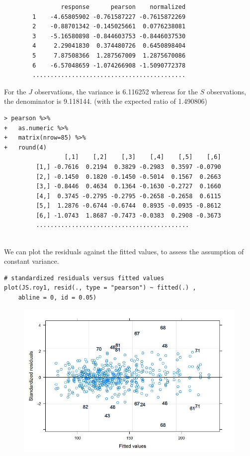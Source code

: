\documentclass[Main.tex]{subfiles}
\begin{document}
\begin{verbatim}
                response      pearson    normalized
        1    -4.65805902 -0.761587227 -0.7615872269
        2    -0.88701342 -0.145025661  0.0776238081
        3    -5.16580898 -0.844603753 -0.8446037530
        4     2.29041830  0.374480726  0.6450898404
        5     7.87508366  1.287567009  1.2875670086
        6    -6.57048659 -1.074266908 -1.5090772378
        ...........................................
\end{verbatim}
For the $J$ observations, the variance is 6.116252 whereas for the $S$ observations, the denominator is 9.118144. (with the expected ratio of  1.490806)


\begin{framed}
\begin{verbatim}
> pearson %>%
+   as.numeric %>% 
+   matrix(nrow=85) %>%
+   round(4) 
                 [,1]    [,2]    [,3]    [,4]    [,5]    [,6]
         [1,] -0.7616  0.2194  0.3829 -0.2983  0.3597 -0.0790
         [2,] -0.1450  0.1820 -0.1450 -0.5014  0.1567  0.2663
         [3,] -0.8446  0.4634  0.1364 -0.1630 -0.2727  0.1660
         [4,]  0.3745 -0.2795 -0.2795 -0.2658 -0.2658  0.6115
         [5,]  1.2876 -0.6744 -0.6744  0.8935 -0.0935 -0.8612
         [6,] -1.0743  1.8687 -0.7473 -0.0383  0.2908 -0.3673
         ...........................................
         
\end{verbatim}
\end{framed}

We can plot the residuals against the fitted values, to assess the assumption of constant variance. 
\begin{framed}
\begin{verbatim}
# standardized residuals versus fitted values 
plot(JS.roy1, resid(., type = "pearson") ~ fitted(.) , 
    abline = 0, id = 0.05)
\end{verbatim}
\end{framed}
\begin{figure}[h!]
\centering
\includegraphics[width=0.9\linewidth]{images/Residuals-JS-Roy}
\caption{}
\label{fig:Residuals-JS-Roy}
\end{figure}
\end{document}
